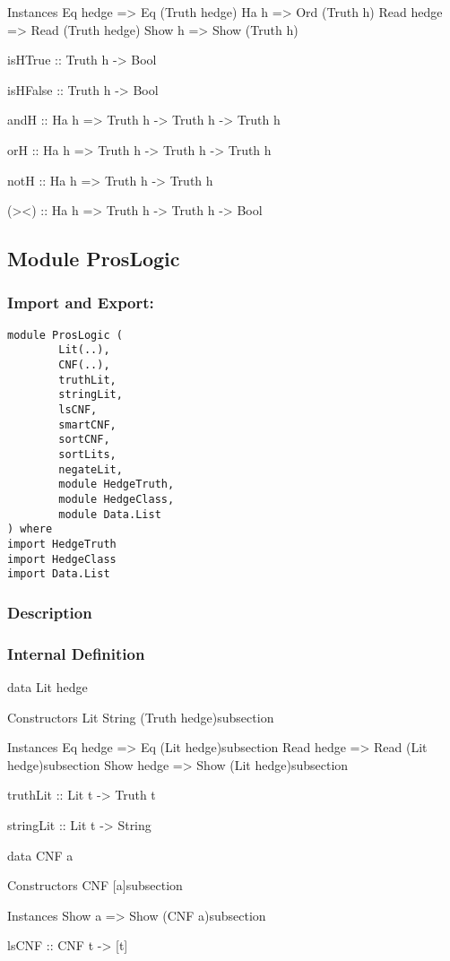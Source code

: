 \documentclass[../gr-final.tex]{subfiles}
\begin{document}
Instances
Eq hedge => Eq (Truth hedge)
Ha h => Ord (Truth h)
Read hedge => Read (Truth hedge)
Show h => Show (Truth h)

isHTrue :: Truth h -> Bool

isHFalse :: Truth h -> Bool

andH :: Ha h => Truth h -> Truth h -> Truth h

orH :: Ha h => Truth h -> Truth h -> Truth h

notH :: Ha h => Truth h -> Truth h

(><) :: Ha h => Truth h -> Truth h -> Bool

\subsection{Module ProsLogic}
\subsubsection{Import and Export:}
\begin{lstlisting}
module ProsLogic (
        Lit(..),
        CNF(..),
        truthLit,
        stringLit,
        lsCNF,
        smartCNF,
        sortCNF,
        sortLits,
        negateLit,
        module HedgeTruth,
        module HedgeClass,
        module Data.List
) where
import HedgeTruth
import HedgeClass
import Data.List
\end{lstlisting}

\subsubsection{Description}
\subsubsection{Internal Definition}

data Lit hedge

Constructors
Lit String (Truth hedge)subsection 

Instances
Eq hedge => Eq (Lit hedge)subsection 
Read hedge => Read (Lit hedge)subsection 
Show hedge => Show (Lit hedge)subsection 

truthLit :: Lit t -> Truth t

stringLit :: Lit t -> String

data CNF a

Constructors
CNF [a]subsection 

Instances
Show a => Show (CNF a)subsection 

lsCNF :: CNF t -> [t]
\end{document}
